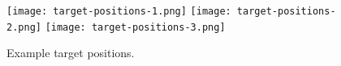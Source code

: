 \begin{figure*} %
\texttt{[image: target-positions-1.png]}
\hspace{2em}
\texttt{[image: target-positions-2.png]}
\hspace{2em}
\texttt{[image: target-positions-3.png]}
\caption{Example target positions.}
\label{fig:whitespace-polygons}
\end{figure*}
